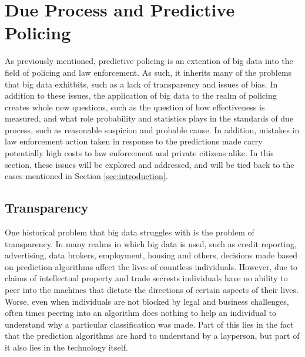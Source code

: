 \documentclass[12pt]{article} %
\begin{document}




\section{Due Process and Predictive Policing}\label{sec:mainbody} %
As previously mentioned, predictive policing is an extention of big data into the field of policing and law enforcement. As such, it inherits many of the problems that big data exhitbits, such as a lack of transparency and issues of bias. In addition to these issues, the application of big data to the realm of policing creates whole new questions, such as the question of how effectiveness is measured, and what role probability and statistics plays in the standards of due process, such as reasonable suspicion and probable cause. In addition, mistakes in law enforcement action taken in response to the predictions made carry potentially high costs to law enforcement and private citizens alike. In this section, these issues will be explored and addressed, and will be tied back to the cases mentioned in Section \ref{sec:introduction}.

\subsection{Transparency} \label{subsec:transparency}
One historical problem that big data struggles with is the problem of transparency. In many realms in which big data is used, such as credit reporting, advertising, data brokers, employment, housing and others, decisions made based on prediction algorithms affect the lives of countless individuals. However, due to claims of intellectual property and trade secrests individuals have no ability to peer into the machines that dictate the directions of certain aspects of their lives. Worse, even when individuals are not blocked by legal and business challenges, often times peering into an algorithm does nothing to help an individual to understand why a particular classification was made. Part of this lies in the fact that the prediction algorithms are hard to understand by a layperson, but part of it also lies in the technology itself. 
\end{document}
